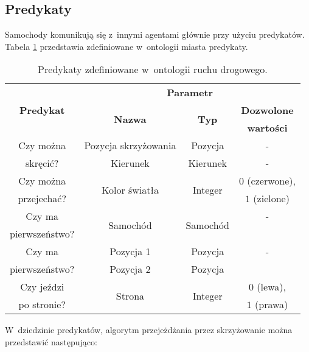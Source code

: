 \documentclass[a4paper,11pt]{article}
\begin{document}
\subsection{Predykaty}
\label{sec:predicates}

Samochody komunikują się z~innymi agentami głównie przy użyciu predykatów. Tabela \ref{tab:predicates} przedstawia zdefiniowane w~ontologii miasta predykaty.

\begin{table}[ht!]
    \centering
    \begin{tabular}{|c|c|c|c|}
        \hline
        \multirow{3}{*}{\textbf{Predykat}} & \multicolumn{3}{|c|}{\textbf{Parametr}} \\
        \cline{2-4}
        & \multirow{2}{*}{\textbf{Nazwa}} & \multirow{2}{*}{\textbf{Typ}} & \textbf{Dozwolone} \\
        &&& \textbf{wartości} \\
        \hline
        Czy można & Pozycja skrzyżowania & Pozycja & - \\
        \cline{2-4}
        skręcić? & Kierunek & Kierunek & - \\
        \hline
        Czy można & \multirow{2}{*}{Kolor światła} & \multirow{2}{*}{Integer} & $0$ (czerwone), \\
        przejechać? &&& $1$ (zielone) \\
        \hline
        Czy ma & \multirow{2}{*}{Samochód} & \multirow{2}{*}{Samochód} & - \\
        pierwszeństwo? &&& \\
        \hline
        Czy ma & Pozycja 1 & Pozycja & - \\
        \cline{2-4}
        pierwszeństwo? & Pozycja 2 & Pozycja & \\
        \hline
        Czy jeździ & \multirow{2}{*}{Strona} & \multirow{2}{*}{Integer} & $0$ (lewa), \\
        po stronie? &&& $1$ (prawa) \\
        \hline
    \end{tabular}

    \caption{Predykaty zdefiniowane w~ontologii ruchu drogowego.}
    \label{tab:predicates}
\end{table}

W~dziedzinie predykatów, algorytm przejeżdżania przez skrzyżowanie można przedstawić następująco:
\end{document}
